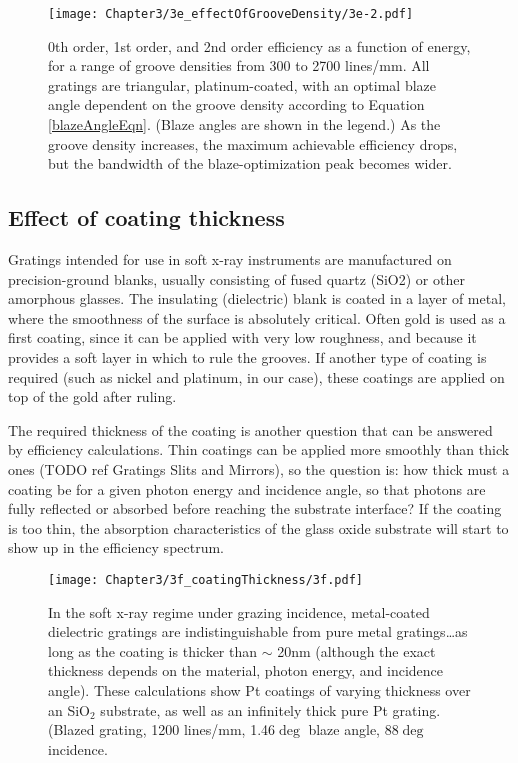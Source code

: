 \begin{figure}[htbp] %
   \centering
   \texttt{[image: Chapter3/3e\_effectOfGrooveDensity/3e-2.pdf]} 
   \caption{0th order, 1st order, and 2nd order efficiency as a function of energy, for a range of groove densities from 300 to 2700 lines/mm.  All gratings are triangular, platinum-coated, with an optimal blaze angle dependent on the groove density according to Equation \ref{blazeAngleEqn}.  (Blaze angles are shown in the legend.)  As the groove density increases, the maximum achievable efficiency drops, but the bandwidth of the blaze-optimization peak becomes wider.}
   \label{3e-2}
\end{figure}

\subsection{Effect of coating thickness}
Gratings intended for use in soft x-ray instruments are manufactured on precision-ground  blanks, usually consisting of fused quartz (SiO2) or other amorphous glasses.  The insulating (dielectric) blank is coated in a layer of metal, where the smoothness of the surface is absolutely critical.  Often gold is used as a first coating, since it can be applied with very low roughness, and because it provides a soft layer in which to rule the grooves.  If another type of coating is required (such as nickel and platinum, in our case), these coatings are applied on top of the gold after ruling.

The required thickness of the coating is another question that can be answered by efficiency calculations.   Thin coatings can be applied more smoothly than thick ones (TODO ref Gratings Slits and Mirrors), so the question is: how thick must a coating be for a given photon energy and incidence angle, so that photons are fully reflected or absorbed before reaching the substrate interface?  If the coating is too thin, the absorption characteristics of the glass oxide substrate will start to show up in the efficiency spectrum.

\begin{figure}[htbp] %
   \centering
   \texttt{[image: Chapter3/3f\_coatingThickness/3f.pdf]} 
   \caption{In the soft x-ray regime under grazing incidence, metal-coated dielectric gratings are indistinguishable from pure metal gratings\ldots as long as the coating is thicker than $\sim$ 20nm (although the exact thickness depends on the material, photon energy, and incidence angle).  These calculations show Pt coatings of varying thickness over an SiO$_2$ substrate, as well as an infinitely thick pure Pt grating.  (Blazed grating, 1200 lines/mm, 1.46$\deg$ blaze angle, 88$\deg$ incidence.}
   \label{3f}
\end{figure}

